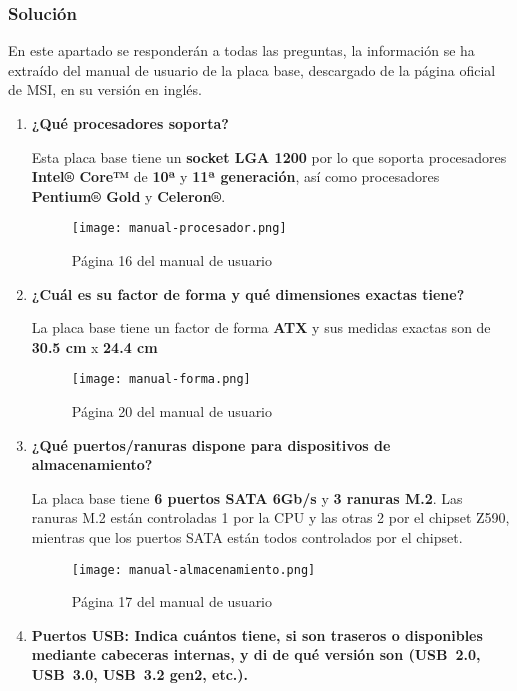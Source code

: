 \subsubsection{Solución}
En este apartado se responderán a todas las preguntas, la información se ha extraído del manual de usuario de la placa base, descargado de la página oficial de MSI, en su versión en inglés. \cite{msi03}
\begin{enumerate}
    \item \textbf{¿Qué procesadores soporta?}

    Esta placa base tiene un \textbf{socket LGA 1200} por lo que soporta procesadores \textbf{Intel® Core™} de \textbf{10ª} y \textbf{11ª generación}, así como procesadores \textbf{Pentium® Gold} y \textbf{Celeron®}.

    \begin{figure}[ht]
        \centering
        \texttt{[image: manual-procesador.png]}
        \caption{Página 16 del manual de usuario}
    \end{figure}

    \item \textbf{¿Cuál es su factor de forma y qué dimensiones exactas tiene?}

    La placa base tiene un factor de forma \textbf{ATX} y sus medidas exactas son de \textbf{30.5 cm} x \textbf{24.4 cm}

    \begin{figure}[ht]
        \centering
        \texttt{[image: manual-forma.png]}
        \caption{Página 20 del manual de usuario}
    \end{figure}

    \item \textbf{¿Qué puertos/ranuras dispone para dispositivos de almacenamiento?}

    La placa base tiene \textbf{6 puertos SATA 6Gb/s} y \textbf{3 ranuras M.2}. Las ranuras M.2 están controladas 1 por la CPU y las otras 2 por el chipset Z590, mientras que los puertos SATA están todos controlados por el chipset.

    \begin{figure}[ht]
        \centering
        \texttt{[image: manual-almacenamiento.png]}
        \caption{Página 17 del manual de usuario}
    \end{figure}

    \item \textbf{Puertos USB: Indica cuántos tiene, si son traseros o disponibles mediante cabeceras internas, y di de qué versión son (USB 2.0, USB 3.0, USB 3.2 gen2, etc.).}


\end{enumerate}
